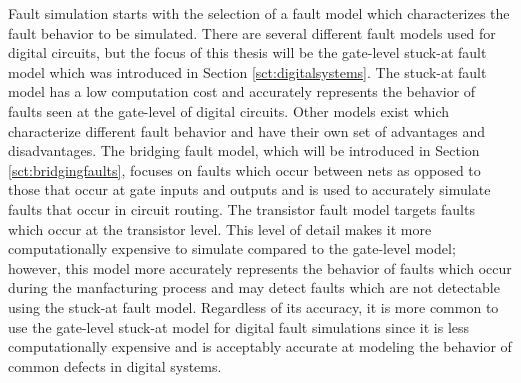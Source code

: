 \documentclass[12pt]{report}
\begin{document}
Fault simulation starts with the selection of a fault model which characterizes the fault behavior to be simulated.  There are several different fault models used for digital circuits, but the focus of this thesis will be the gate-level stuck-at fault model which was introduced in Section \ref{sct:digitalsystems}.  The stuck-at fault model has a low computation cost and accurately represents the behavior of faults seen at the gate-level of digital circuits\cite{stroud}.  Other models exist which characterize different fault behavior and have their own set of advantages and disadvantages.  The bridging fault model, which will be introduced in Section \ref{sct:bridgingfaults}, focuses on faults which occur between nets as opposed to those that occur at gate inputs and outputs and is used to accurately simulate faults that occur in circuit routing\cite{stroud-bridging}.  The transistor fault model targets faults which occur at the transistor level.  This level of detail makes it more computationally expensive to simulate compared to the gate-level model; however, this model more accurately represents the behavior of faults which occur during the manfacturing process\cite{defectforcmos} and may detect faults which are not detectable using the stuck-at fault  model.  Regardless of its accuracy, it is more common to use the gate-level stuck-at model for digital fault simulations since it is less computationally expensive and is acceptably accurate at modeling the behavior of common defects in digital systems\cite{defectforcmos}.  
\end{document}
